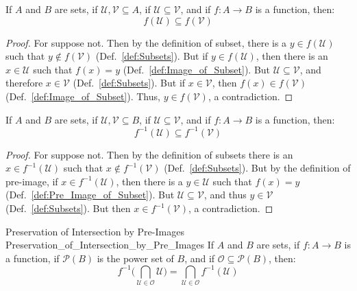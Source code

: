     \begin{theorem}
        If $A$ and $B$ are sets, if $\mathcal{U},\mathcal{V}\subseteq{A}$, if
        $\mathcal{U}\subseteq\mathcal{V}$, and if $f:A\rightarrow{B}$ is a
        function, then:
        \begin{equation*}
            f(\mathcal{U})\subseteq{f}(\mathcal{V})
        \end{equation*}
    \end{theorem}
    \begin{proof}
        For suppose not. Then by the definition of subset, there is a
        $y\in{f}(\mathcal{U})$ such that $y\notin{f}(\mathcal{V})$
        (Def.~\ref{def:Subsets}). But if $y\in{f}(\mathcal{U})$, then there is
        an $x\in\mathcal{U}$ such that $f(x)=y$
        (Def.~\ref{def:Image_of_Subset}). But $\mathcal{U}\subseteq\mathcal{V}$,
        and therefore $x\in\mathcal{V}$ (Def.~\ref{def:Subsets}). But if
        $x\in\mathcal{V}$, then $f(x)\in{f}(\mathcal{V})$
        (Def.~\ref{def:Image_of_Subset}). Thus, $y\in{f}(\mathcal{V})$,
        a contradiction.
    \end{proof}
    \begin{theorem}
        If $A$ and $B$ are sets, if $\mathcal{U},\mathcal{V}\subseteq{B}$, if
        $\mathcal{U}\subseteq\mathcal{V}$, and if $f:A\rightarrow{B}$ is a
        function, then:
        \begin{equation*}
            f^{\minus{1}}(\mathcal{U})\subseteq{f^{\minus{1}}}(\mathcal{V})
        \end{equation*}
    \end{theorem}
    \begin{proof}
        For suppose not. Then by the definition of subsets there is an
        $x\in{f}^{\minus{1}}(\mathcal{U})$ such that
        $x\notin{f}^{\minus{1}}(\mathcal{V})$ (Def.~\ref{def:Subsets}). But by
        the definition of pre-image, if $x\in{f}^{\minus{1}}(\mathcal{U})$, then
        there is a $y\in\mathcal{U}$ such that $f(x)=y$
        (Def.~\ref{def:Pre_Image_of_Subset}). But
        $\mathcal{U}\subseteq\mathcal{V}$, and thus $y\in\mathcal{V}$
        (Def.~\ref{def:Subsets}). But then $x\in{f}^{\minus{1}}(\mathcal{V})$, a
        contradiction.
    \end{proof}
    \begin{ftheorem}{Preservation of Intersection by Pre-Images}
                    {Preservation_of_Intersection_by_Pre_Images}
        If $A$ and $B$ are sets, if $f:A\rightarrow{B}$ is a function, if
        $\mathcal{P}(B)$ is the power set of $B$, and if
        $\mathcal{O}\subseteq\mathcal{P}(B)$, then:
        \begin{equation*}
            f^{\minus{1}}\Big(
                \bigcap_{\mathcal{U}\in\mathcal{O}}\mathcal{U}\Big)
            =\bigcap_{\mathcal{U}\in\mathcal{O}}f^{\minus{1}}(\mathcal{U})
        \end{equation*}
    \end{ftheorem}
